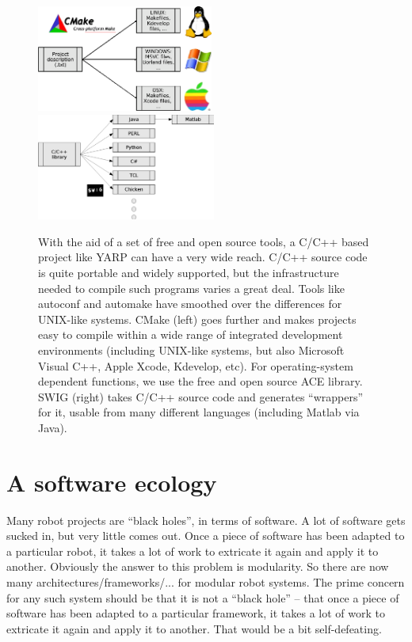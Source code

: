 

\begin{figure}[t]
\begin{center}
\includegraphics[height=3.5cm]{fig-cmake}
\ \ \ \ \ \ 
\includegraphics[height=3.5cm]{fig-swig}
\caption{
%
With the aid of a set of free and open source tools, 
a C/C++ based project like YARP can have a very
wide reach.
%
C/C++ source code is quite portable and widely supported, but the
infrastructure needed to compile such programs varies a great 
deal.  Tools like autoconf and automake have smoothed over
the differences for UNIX-like systems. CMake (left) goes
further and makes projects easy to compile within a
wide range of integrated development environments
(including UNIX-like systems, but also Microsoft Visual C++,
Apple Xcode, Kdevelop, etc).
%
For operating-system dependent functions, we use the free
and open source ACE library.
%
SWIG (right) takes C/C++ source code and generates ``wrappers''
for it, usable from many different languages (including Matlab
via Java).
%
%
}
\end{center}
\end{figure}


\section{A software ecology}




Many robot projects are ``black holes'', in terms of software.  A lot
of software gets sucked in, but very little comes out.  Once a piece
of software has been adapted to a particular robot, it takes a lot
of work to extricate it again and apply it to another.
%
Obviously the answer to this problem is modularity.  So there are 
now many architectures/frameworks/... for modular robot systems.
The prime concern for any such system should be that it is not
a ``black hole'' -- that once a piece of software has been adapted
to a particular framework, it takes a lot of work to extricate it
again and apply it to another.  That would be a bit self-defeating.

